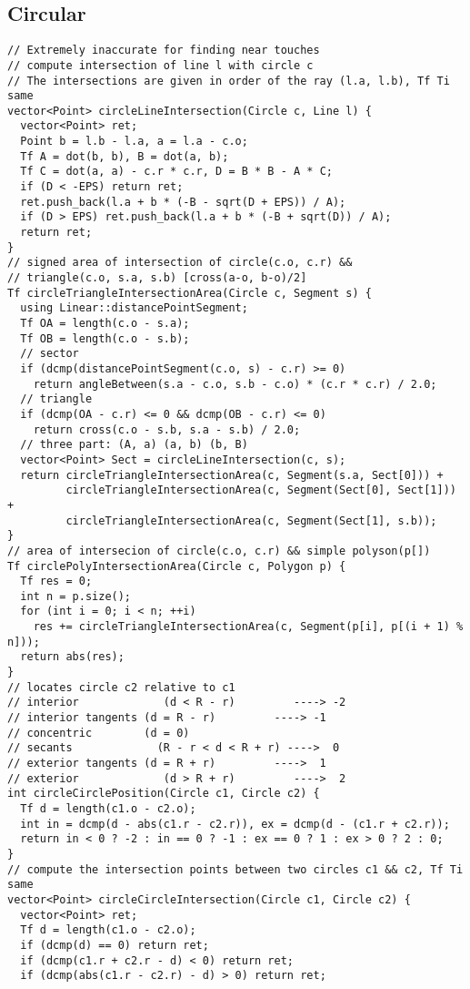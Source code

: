 \documentclass[FSZ,a4paper,onesided]{article}
\begin{document}
\begin{multicols*}{\COLS}
\subsection{Circular}
\begin{lstlisting}
// Extremely inaccurate for finding near touches
// compute intersection of line l with circle c
// The intersections are given in order of the ray (l.a, l.b), Tf Ti same
vector<Point> circleLineIntersection(Circle c, Line l) {
  vector<Point> ret;
  Point b = l.b - l.a, a = l.a - c.o;
  Tf A = dot(b, b), B = dot(a, b);
  Tf C = dot(a, a) - c.r * c.r, D = B * B - A * C;
  if (D < -EPS) return ret;
  ret.push_back(l.a + b * (-B - sqrt(D + EPS)) / A);
  if (D > EPS) ret.push_back(l.a + b * (-B + sqrt(D)) / A);
  return ret;
}
// signed area of intersection of circle(c.o, c.r) &&
// triangle(c.o, s.a, s.b) [cross(a-o, b-o)/2]
Tf circleTriangleIntersectionArea(Circle c, Segment s) {
  using Linear::distancePointSegment;
  Tf OA = length(c.o - s.a);
  Tf OB = length(c.o - s.b);
  // sector
  if (dcmp(distancePointSegment(c.o, s) - c.r) >= 0)
    return angleBetween(s.a - c.o, s.b - c.o) * (c.r * c.r) / 2.0;
  // triangle
  if (dcmp(OA - c.r) <= 0 && dcmp(OB - c.r) <= 0)
    return cross(c.o - s.b, s.a - s.b) / 2.0;
  // three part: (A, a) (a, b) (b, B)
  vector<Point> Sect = circleLineIntersection(c, s);
  return circleTriangleIntersectionArea(c, Segment(s.a, Sect[0])) +
         circleTriangleIntersectionArea(c, Segment(Sect[0], Sect[1])) +
         circleTriangleIntersectionArea(c, Segment(Sect[1], s.b));
}
// area of intersecion of circle(c.o, c.r) && simple polyson(p[])
Tf circlePolyIntersectionArea(Circle c, Polygon p) {
  Tf res = 0;
  int n = p.size();
  for (int i = 0; i < n; ++i)
    res += circleTriangleIntersectionArea(c, Segment(p[i], p[(i + 1) % n]));
  return abs(res);
}
// locates circle c2 relative to c1
// interior             (d < R - r)         ----> -2
// interior tangents (d = R - r)         ----> -1
// concentric        (d = 0)
// secants             (R - r < d < R + r) ---->  0
// exterior tangents (d = R + r)         ---->  1
// exterior             (d > R + r)         ---->  2
int circleCirclePosition(Circle c1, Circle c2) {
  Tf d = length(c1.o - c2.o);
  int in = dcmp(d - abs(c1.r - c2.r)), ex = dcmp(d - (c1.r + c2.r));
  return in < 0 ? -2 : in == 0 ? -1 : ex == 0 ? 1 : ex > 0 ? 2 : 0;
}
// compute the intersection points between two circles c1 && c2, Tf Ti same
vector<Point> circleCircleIntersection(Circle c1, Circle c2) {
  vector<Point> ret;
  Tf d = length(c1.o - c2.o);
  if (dcmp(d) == 0) return ret;
  if (dcmp(c1.r + c2.r - d) < 0) return ret;
  if (dcmp(abs(c1.r - c2.r) - d) > 0) return ret;


\end{lstlisting}
\end{multicols*}
\end{document}
